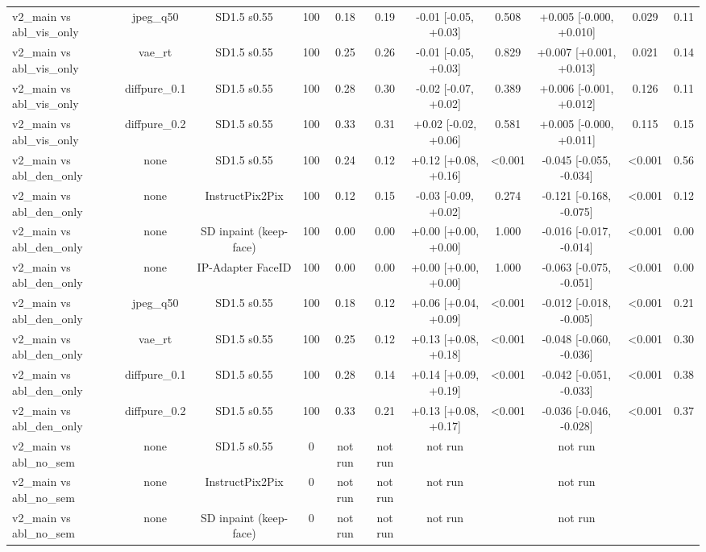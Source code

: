 \begin{table}[t]
{\begin{tabular}{lcccccccccc}
v2\_main vs abl\_vis\_only & jpeg\_q50 & SD1.5 s0.55 & 100 & 0.18 & 0.19 & -0.01 [-0.05, +0.03] & 0.508 & +0.005 [-0.000, +0.010] & 0.029 & 0.11 \\
v2\_main vs abl\_vis\_only & vae\_rt & SD1.5 s0.55 & 100 & 0.25 & 0.26 & -0.01 [-0.05, +0.03] & 0.829 & +0.007 [+0.001, +0.013] & 0.021 & 0.14 \\
v2\_main vs abl\_vis\_only & diffpure\_0.1 & SD1.5 s0.55 & 100 & 0.28 & 0.30 & -0.02 [-0.07, +0.02] & 0.389 & +0.006 [-0.001, +0.012] & 0.126 & 0.11 \\
v2\_main vs abl\_vis\_only & diffpure\_0.2 & SD1.5 s0.55 & 100 & 0.33 & 0.31 & +0.02 [-0.02, +0.06] & 0.581 & +0.005 [-0.000, +0.011] & 0.115 & 0.15 \\
v2\_main vs abl\_den\_only & none & SD1.5 s0.55 & 100 & 0.24 & 0.12 & +0.12 [+0.08, +0.16] & <0.001 & -0.045 [-0.055, -0.034] & <0.001 & 0.56 \\
v2\_main vs abl\_den\_only & none & InstructPix2Pix & 100 & 0.12 & 0.15 & -0.03 [-0.09, +0.02] & 0.274 & -0.121 [-0.168, -0.075] & <0.001 & 0.12 \\
v2\_main vs abl\_den\_only & none & SD inpaint (keep-face) & 100 & 0.00 & 0.00 & +0.00 [+0.00, +0.00] & 1.000 & -0.016 [-0.017, -0.014] & <0.001 & 0.00 \\
v2\_main vs abl\_den\_only & none & IP-Adapter FaceID & 100 & 0.00 & 0.00 & +0.00 [+0.00, +0.00] & 1.000 & -0.063 [-0.075, -0.051] & <0.001 & 0.00 \\
v2\_main vs abl\_den\_only & jpeg\_q50 & SD1.5 s0.55 & 100 & 0.18 & 0.12 & +0.06 [+0.04, +0.09] & <0.001 & -0.012 [-0.018, -0.005] & <0.001 & 0.21 \\
v2\_main vs abl\_den\_only & vae\_rt & SD1.5 s0.55 & 100 & 0.25 & 0.12 & +0.13 [+0.08, +0.18] & <0.001 & -0.048 [-0.060, -0.036] & <0.001 & 0.30 \\
v2\_main vs abl\_den\_only & diffpure\_0.1 & SD1.5 s0.55 & 100 & 0.28 & 0.14 & +0.14 [+0.09, +0.19] & <0.001 & -0.042 [-0.051, -0.033] & <0.001 & 0.38 \\
v2\_main vs abl\_den\_only & diffpure\_0.2 & SD1.5 s0.55 & 100 & 0.33 & 0.21 & +0.13 [+0.08, +0.17] & <0.001 & -0.036 [-0.046, -0.028] & <0.001 & 0.37 \\
v2\_main vs abl\_no\_sem & none & SD1.5 s0.55 & 0 & not run & not run & not run &  & not run &  &  \\
v2\_main vs abl\_no\_sem & none & InstructPix2Pix & 0 & not run & not run & not run &  & not run &  &  \\
v2\_main vs abl\_no\_sem & none & SD inpaint (keep-face) & 0 & not run & not run & not run &  & not run &  &  \\

\end{tabular}}
\end{table}

